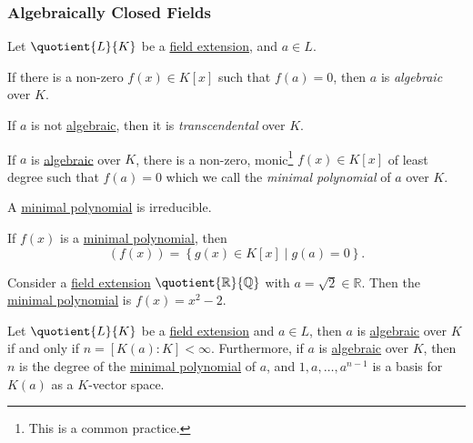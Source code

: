 \subsubsection{Algebraically Closed Fields}
\begin{definition*}
	Let \(\quotient{L}{K} \) be a \hyperref[def:field-extension]{field extension}, and \(a\in L\).
	\begin{definition}[Algebraic]\label{def:algebraic}
		If there is a non-zero \(f(x)\in K[x]\) such that \(f(a) = 0\), then \(a\) is \emph{algebraic} over \(K\).
	\end{definition}

	\begin{definition}[Transcendental]\label{def:transcendental}
		If \(a\) is not \hyperref[def:algebraic]{algebraic}, then it is \emph{transcendental} over \(K\).
	\end{definition}
\end{definition*}

\begin{definition}\label{def:minimal-polynomial}
	If \(a\) is \hyperref[def:algebraic]{algebraic} over \(K\), there is a non-zero, monic\footnote{This is a common practice.} \(f(x)\in K[x]\) of least degree such that \(f(a) = 0\) which we call the \emph{minimal polynomial} of \(a\) over \(K\).
\end{definition}

\begin{remark}
	A \hyperref[def:minimal-polynomial]{minimal polynomial} is irreducible.
\end{remark}

\begin{remark}
	If \(f(x)\) is a \hyperref[def:minimal-polynomial]{minimal polynomial}, then
	\[
		(f(x)) = \left\{ g(x)\in K[x] \mid g(a) = 0 \right\}.
	\]
\end{remark}
\begin{eg}
	Consider a \hyperref[def:field-extension]{field extension} \(\quotient{\mathbb{R} }{\mathbb{Q} } \) with \(a = \sqrt{2} \in \mathbb{R} \). Then the \hyperref[def:minimal-polynomial]{minimal polynomial} is \(f(x) = x^2 - 2\).
\end{eg}

\begin{theorem}\label{thm:lec11-2}
	Let \(\quotient{L}{K} \) be a \hyperref[def:field-extension]{field extension} and \(a\in L\), then \(a\) is \hyperref[def:algebraic]{algebraic} over \(K\) if and only if \(n = [K(a) \colon K] < \infty \). Furthermore, if \(a\) is \hyperref[def:algebraic]{algebraic} over \(K\), then \(n\) is the degree of the \hyperref[def:minimal-polynomial]{minimal polynomial} of \(a\), and \(1, a, \ldots , a^{n-1}\) is a basis for \(K(a)\) as a \(K\)-vector space.
\end{theorem}

